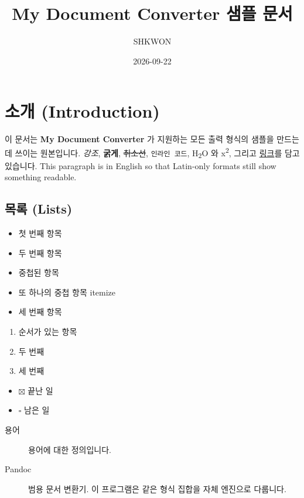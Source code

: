 \documentclass[11pt]{article}
\title{My Document Converter 샘플 문서}
\author{SHKWON}
\date{2026-09-22}
\begin{document}
\maketitle

\section*{소개 (Introduction)}\label{소개-introduction}

이 문서는 \textbf{My Document Converter} 가 지원하는 모든 출력 형식의 샘플을 만드는 데 쓰이는
원본입니다.
\emph{강조}, \textbf{굵게}, \sout{취소선}, \verb|인라인 코드|, H\textsubscript{2}O 와
x\textsuperscript{2}, 그리고 \href{https://example.com}{링크}를 담고 있습니다.
This paragraph is in English so that Latin-only formats still show
something readable.

\subsection*{목록 (Lists)}\label{목록-lists}

\begin{itemize}
\item 첫 번째 항목
\item 두 번째 항목
\begin{itemize}

\end{itemize}
\item 중첩된 항목
\item 또 하나의 중첩 항목
itemize
\item 세 번째 항목
\end{itemize}

\begin{enumerate}
\item 순서가 있는 항목
\item 두 번째
\item 세 번째
\end{enumerate}

\begin{itemize}
\item $\boxtimes$ 끝난 일
\item $\square$ 남은 일
\end{itemize}

\begin{description}
\item[용어] 용어에 대한 정의입니다.
\item[Pandoc] 범용 문서 변환기. 이 프로그램은 같은 형식 집합을 자체 엔진으로 다룹니다.
\end{description}
\end{document}
